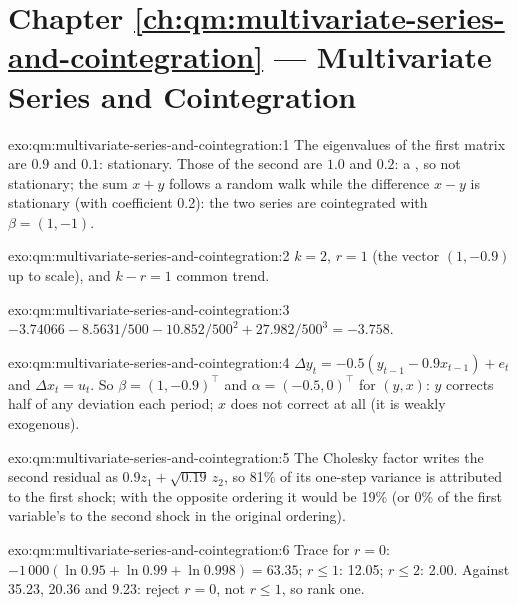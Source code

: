 \section*{Chapter \ref{ch:qm:multivariate-series-and-cointegration} --- Multivariate Series and Cointegration}

\begin{solution}{exo:qm:multivariate-series-and-cointegration:1}
The eigenvalues of the first matrix are $0.9$ and $0.1$: stationary. Those of the second are $1.0$ and $0.2$: a , so not stationary; the sum $x + y$
follows a random walk while the difference $x - y$ is stationary (with coefficient 0.2): the two series are cointegrated with $\beta = (1, -1)$.
\end{solution}

\begin{solution}{exo:qm:multivariate-series-and-cointegration:2}
$k = 2$, $r = 1$ (the vector $(1, -0.9)$ up to scale), and $k - r = 1$ common trend.
\end{solution}

\begin{solution}{exo:qm:multivariate-series-and-cointegration:3}
$-3.74066 - 8.5631/500 - 10.852/500^2 + 27.982/500^3 = -3.758$.
\end{solution}

\begin{solution}{exo:qm:multivariate-series-and-cointegration:4}
$\Delta y_t = -0.5(y_{t-1} - 0.9x_{t-1}) + e_t$ and $\Delta x_t = u_t$. So $\beta = (1, -0.9)^\top$ and $\alpha = (-0.5, 0)^\top$ for $(y, x)$: $y$ corrects half of any deviation
each period; $x$ does not correct at all (it is weakly exogenous).
\end{solution}

\begin{solution}{exo:qm:multivariate-series-and-cointegration:5}
The Cholesky factor writes the second residual as $0.9z_1 + \sqrt{0.19}\,z_2$, so 81\% of its one-step variance is attributed to the first shock; with the opposite ordering
it would be 19\% (or 0\% of the first variable's to the second shock in the original ordering).
\end{solution}

\begin{solution}{exo:qm:multivariate-series-and-cointegration:6}
Trace for $r = 0$: $-1\,000(\ln0.95 + \ln0.99 + \ln0.998) = 63.35$; $r \le 1$: 12.05; $r \le 2$: 2.00. Against 35.23, 20.36 and 9.23: reject $r = 0$, not $r \le 1$, so rank one.
\end{solution}

